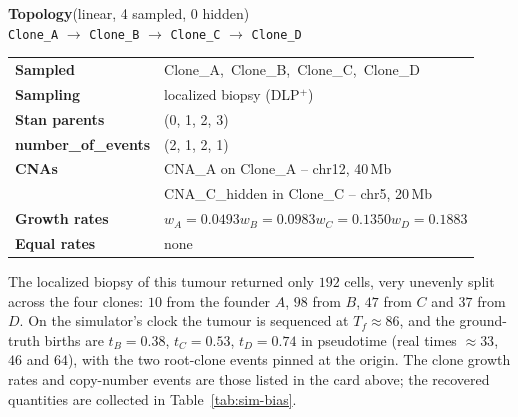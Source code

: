 \begin{tcolorbox}[colback=white, colframe=procblue, boxrule=0.5pt, arc=2pt,
  coltitle=white, colbacktitle=procblue, fonttitle=\bfseries\large,
  title={Linear chain (4 clones) \hfill \normalfont\normalsize Nnodes=4 \ \textbar\ Nevents=6 \ \textbar\ Nequations=8}]

\begin{tcolorbox}[colback=white, colframe=procblue!55, boxrule=0.4pt, arc=1pt,
  left=3pt,right=3pt,top=3pt,bottom=3pt]
\textbf{Topology}\quad (linear, 4 sampled, 0 hidden)\\[3pt]
\texttt{Clone\_A} $\longrightarrow$ \texttt{Clone\_B} $\longrightarrow$ \texttt{Clone\_C} $\longrightarrow$ \texttt{Clone\_D}
\end{tcolorbox}

\vspace{4pt}
\begin{tabular}{@{}ll@{}}
\toprule
\textbf{Sampled}            & Clone\_A,\ Clone\_B,\ Clone\_C,\ Clone\_D \\
\textbf{Sampling}           & localized biopsy (DLP$^+$) \\
\textbf{Stan parents}       & (0, 1, 2, 3) \\
\textbf{number\_of\_events} & (2, 1, 2, 1) \\
\midrule
\textbf{CNAs}               & CNA\_A on Clone\_A -- chr12, 40\,Mb \\
                            & CNA\_C\_hidden in Clone\_C -- chr5, 20\,Mb \\
\midrule
\textbf{Growth rates}       & $w_A{=}0.0493$\quad $w_B{=}0.0983$\quad $w_C{=}0.1350$\quad $w_D{=}0.1883$ \\
\textbf{Equal rates}        & none \\
\bottomrule
\end{tabular}
\end{tcolorbox}



The localized biopsy of this tumour returned only $192$ cells, very unevenly split
across the four clones: $10$ from the founder $A$, $98$ from $B$, $47$ from $C$ and
$37$ from $D$. On the simulator's clock the tumour is sequenced at $T_f\approx 86$,
and the ground-truth births are $t_B=0.38$, $t_C=0.53$, $t_D=0.74$ in pseudotime
(real times $\approx 33$, $46$ and $64$), with the two root-clone events pinned at
the origin. The clone growth rates and copy-number events are those listed in the
card above; the recovered quantities are collected in Table~\ref{tab:sim-bias}.

